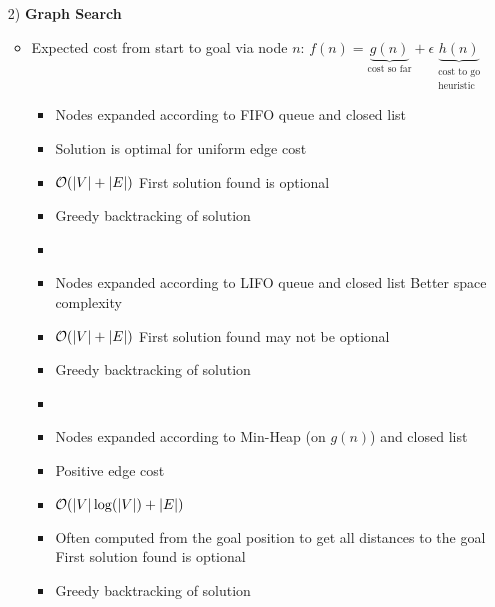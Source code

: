 \begin{itemize}
\begin{itemize}
\begin{itemize}
                \end{itemize}
        \end{itemize}
    \item[2)] \textbf{Graph Search}
        \begin{itemize}
            \item Expected cost from start to goal via node $n$: $f(n) = \underbrace{g(n)}_{\text{cost so far}} + \epsilon \underbrace{h(n)}_{\substack{\text{cost to go} \\ \text{heuristic}}}$
                \begin{itemize}
                    \item Nodes expanded according to FIFO queue and closed list
                    \item Solution is optimal for uniform edge cost
                    \item $\mathcal{O}(|V| + |E|)$
                    \ipro First solution found is optional
                    \item Greedy backtracking of solution
                    \item {}
                \end{itemize}
                \begin{itemize}
                    \item Nodes expanded according to LIFO queue and closed list
                    \ipro Better space complexity
                    \item $\mathcal{O}(|V| + |E|)$
                    \icon First solution found may not be optional
                    \item Greedy backtracking of solution
                    \item {}
                \end{itemize}
                \begin{itemize}
                    \item Nodes expanded according to Min-Heap (on $g(n)$) and closed list
                    \item Positive edge cost
                    \item $\mathcal{O}(|V| \log(|V|) + |E|)$
                    \item Often computed from the goal position to get all distances to the goal
                    \ipro First solution found is optional
                    \item Greedy backtracking of solution

\end{itemize}
\end{itemize}
\end{itemize}
